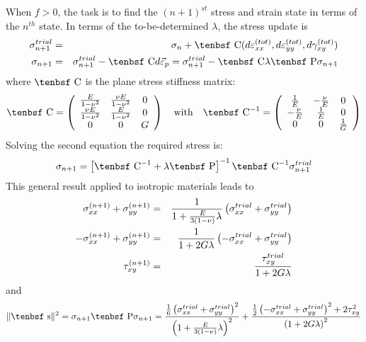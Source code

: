 \documentclass[11pt]{article}
\def\C{\hbox{\tenbsf C}}
\def\dev{\hbox{\tenbsf s}}
\def\dpl{d \vec{\varepsilon}_{p}}
\def\P{\hbox{\tenbsf P}}
\def\s#1{\sigma_{#1}}
\begin{document}
When $f>0$, the task is to find the $(n+1)^{st}$ stress and strain state in terms of the $n^{th}$ state. In terms of the to-be-determined $\lambda$, the stress update is
\begin{eqnarray}
        \s{n+1}^{trial} & = & \sigma_n + \C (d\varepsilon_{xx}^{(tot)},  d\varepsilon_{yy}^{(tot)}, d\gamma_{xy}^{(tot)})  \\
        \s{n+1} & = & \s{n+1}^{trial} - \C \dpl = \s{n+1}^{trial} - \C \lambda \P\s{n+1}
\end{eqnarray}
where $\C$ is the plane stress stiffness matrix:
\begin{equation}
          \C =  \left( \begin{array}{ccc}
                    {E\over 1-\nu^2} & {\nu E\over 1-\nu^2} & 0 \\ 
                    {\nu E\over 1-\nu^2} & {E\over 1-\nu^2} & 0 \\ 
                    0 & 0 & G \end{array}\right)
                   \quad {\rm with} \quad
          \C^{-1} =   \left( \begin{array}{ccc}
                    {1\over E} & -{\nu \over E} & 0 \\ 
                    -{\nu \over E} & {1\over E} & 0 \\ 
                    0 & 0 & {1\over G} \end{array}\right)
\end{equation}
Solving the second equation the required stress is:
\begin{equation}
       \s{n+1} = \left[\C^{-1} + \lambda\P\right]^{-1} \C^{-1}  \s{n+1}^{trial}
\end{equation}
This general result applied to isotropic materials leads to
\begin{eqnarray}
     \s{xx}^{(n+1)} + \s{yy}^{(n+1)} & = & {1\over 1 + { E\over 3(1-\nu)}\lambda} \left( \s{xx}^{trial} +  \s{yy}^{trial} \right) \\
     -\s{xx}^{(n+1)} + \s{yy}^{(n+1)} & = & {1\over 1 + 2 G\lambda} \left( -\s{xx}^{trial} +  \s{yy}^{trial} \right) \\
     \tau_{xy}^{(n+1)} & = & {\tau_{xy}^{trial}\over 1 + 2 G\lambda} 
\end{eqnarray}
and
\begin{equation}
    \|\dev\|^2 = \s{n+1}\P\s{n+1} = {{1\over 6}\left( \s{xx}^{trial} +  \s{yy}^{trial} \right)^2 \over \left( 1 + { E\over 3(1-\nu)}\lambda\right)^2}
             + {{1\over 2}\left( -\s{xx}^{trial} +  \s{yy}^{trial} \right)^2 + 2\tau_{xy}^2 \over \left(1 + 2 G\lambda\right)^2}
\end{equation}
\end{document}
